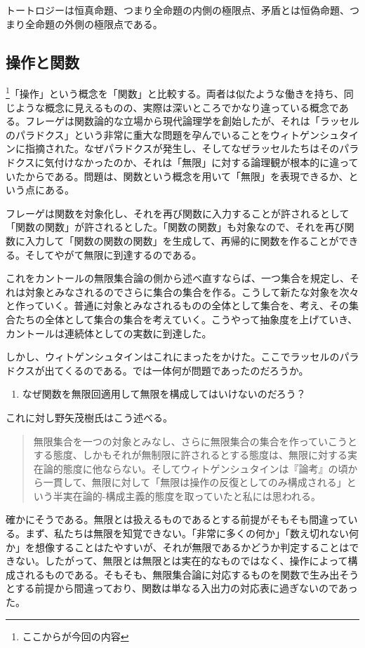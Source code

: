 \documentclass[a4paper,onecolumn,article]{jarticle}
\newcounter{ct}               %
\begin{document}
トートロジーは恒真命題、つまり全命題の内側の極限点、矛盾とは恒偽命題、つまり全命題の外側の極限点である。

\subsection{操作と関数}

\footnote{ここからが今回の内容}「操作」という概念を「関数」と比較する。両者は似たような働きを持ち、同じような概念に見えるものの、実際は深いところでかなり違っている概念である。フレーゲは関数論的な立場から現代論理学を創始したが、それは「ラッセルのパラドクス」という非常に重大な問題を孕んでいることをウィトゲンシュタインに指摘された。なぜパラドクスが発生し、そしてなぜラッセルたちはそのパラドクスに気付けなかったのか、それは「無限」に対する論理観が根本的に違っていたからである。問題は、関数という概念を用いて「無限」を表現できるか、という点にある。

フレーゲは関数を対象化し、それを再び関数に入力することが許されるとして「関数の関数」が許されるとした。「関数の関数」も対象なので、それを再び関数に入力して「関数の関数の関数」を生成して、再帰的に関数を作ることができる。そしてやがて無限に到達するのである。

これをカントールの無限集合論の側から述べ直すならば、一つ集合を規定し、それは対象とみなされるのでさらに集合の集合を作る。こうして新たな対象を次々と作っていく。普通に対象とみなされるものの全体として集合を、考え、その集合たちの全体として集合の集合を考えていく。こうやって抽象度を上げていき、カントールは連続体としての実数に到達した。

しかし、ウィトゲンシュタインはこれにまったをかけた。ここでラッセルのパラドクスが出てくるのである。では一体何が問題であったのだろうか。
{\bf
\begin{enumerate}
  \item なぜ関数を無限回適用して無限を構成してはいけないのだろう？
\end{enumerate}}
これに対し野矢茂樹氏はこう述べる。
{\bf
\begin{quotation}
   無限集合を一つの対象とみなし、さらに無限集合の集合を作っていこうとする態度、しかもそれが無制限に許されるとする態度は、無限に対する実在論的態度に他ならない。そしてウィトゲンシュタインは『論考』の頃から一貫して、無限に対して「無限は操作の反復としてのみ構成される」という半実在論的-構成主義的態度を取っていたと私には思われる。
\end{quotation}}

確かにそうである。無限とは扱えるものであるとする前提がそもそも間違っている。まず、私たちは無限を知覚できない。「非常に多くの何か」「数え切れない何か」を想像することはたやすいが、それが無限であるかどうか判定することはできない。したがって、無限とは無限とは実在的なものではなく、操作によって構成されるものである。そもそも、無限集合論に対応するものを関数で生み出そうとする前提から間違っており、関数は単なる入出力の対応表に過ぎないのであった。
\end{document}
